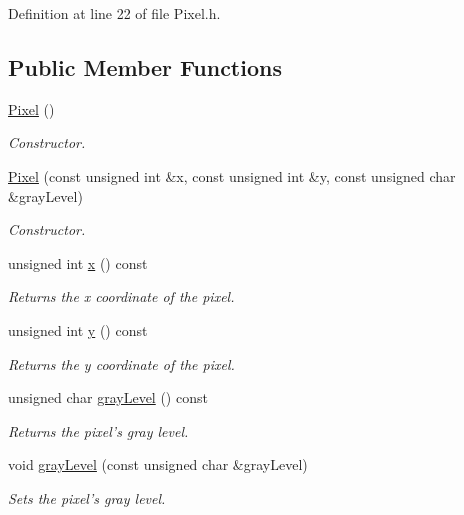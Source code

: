 Definition at line 22 of file Pixel.h.\subsection*{Public Member Functions}
\begin{CompactItemize}
\item 
\hyperlink{class_pixel_27ad99a2f705e635c42d242d530d4756}{Pixel} ()
\begin{CompactList}\small\item\em Constructor. \item\end{CompactList}\item 
\hyperlink{class_pixel_31103b6b7b52712789d1fdab7ab7ce29}{Pixel} (const unsigned int \&x, const unsigned int \&y, const unsigned char \&grayLevel)
\begin{CompactList}\small\item\em Constructor. \item\end{CompactList}\item 
unsigned int \hyperlink{class_pixel_68dafccc4588fb33d445641c2766316b}{x} () const 
\begin{CompactList}\small\item\em Returns the x coordinate of the pixel. \item\end{CompactList}\item 
unsigned int \hyperlink{class_pixel_204cc91a99e1e4f1d96c9cf6caf5747a}{y} () const 
\begin{CompactList}\small\item\em Returns the y coordinate of the pixel. \item\end{CompactList}\item 
unsigned char \hyperlink{class_pixel_d82be37dbb53c7ba48c5464b3a3382c6}{grayLevel} () const 
\begin{CompactList}\small\item\em Returns the pixel's gray level. \item\end{CompactList}\item 
void \hyperlink{class_pixel_d00a337e0d9765daafe3017f2d819df8}{grayLevel} (const unsigned char \&grayLevel)
\begin{CompactList}\small\item\em Sets the pixel's gray level. \item\end{CompactList}\end{CompactItemize}

